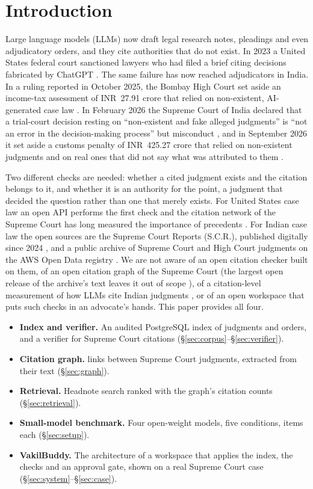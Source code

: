\section{Introduction}
Large language models (LLMs) now draft legal research notes, pleadings and even adjudicatory orders, and they cite authorities that do not exist. In 2023 a United States federal court sanctioned lawyers who had filed a brief citing decisions fabricated by ChatGPT \cite{mata}. The same failure has now reached adjudicators in India. In a ruling reported in October 2025, the Bombay High Court set aside an income-tax assessment of INR~27.91 crore that relied on non-existent, AI-generated case law \cite{kmgwires}. In February 2026 the Supreme Court of India declared that a trial-court decision resting on ``non-existent and fake alleged judgments'' is ``not an error in the decision-making process'' but misconduct \cite{gummadi}, and in September 2026 it set aside a customs penalty of INR~425.27 crore that relied on non-existent judgments and on real ones that did not say what was attributed to them \cite{gadiya}.

Two different checks are needed: whether a cited judgment exists and the citation belongs to it, and whether it is an authority for the point, a judgment that decided the question rather than one that merely exists. For United States case law an open API performs the first check \cite{courtlistenerapi} and the citation network of the Supreme Court has long measured the importance of precedents \cite{fowler2007}. For Indian case law the open sources are the Supreme Court Reports (S.C.R.), published digitally since 2024 \cite{digiscr}, and a public archive of Supreme Court and High Court judgments on the AWS Open Data registry \cite{awssc,awshc}. We are not aware of an open citation checker built on them, of an open citation graph of the Supreme Court (the largest open release of the archive's text leaves it out of scope \cite{openindialaw}), of a citation-level measurement of how LLMs cite Indian judgments \cite{hemrajani2025,juvekar2025}, or of an open workspace that puts such checks in an advocate's hands. This paper provides all four.
\begin{itemize}
\item \textbf{Index and verifier.} An audited PostgreSQL index of \CorpusTotal{} judgments and orders, and a verifier for Supreme Court citations (\S\ref{sec:corpus}--\S\ref{sec:verifier}).
\item \textbf{Citation graph.} \GraphEdges{} links between \GraphTextOK{} Supreme Court judgments, extracted from their text (\S\ref{sec:graph}).
\item \textbf{Retrieval.} Headnote search ranked with the graph's citation counts (\S\ref{sec:retrieval}).
\item \textbf{Small-model benchmark.} Four open-weight models, five conditions, \NumItems{} items each (\S\ref{sec:setup}).
\item \textbf{VakilBuddy.} The architecture of a workspace that applies the index, the checks and an approval gate, shown on a real Supreme Court case (\S\ref{sec:system}--\S\ref{sec:case}).
\end{itemize}

